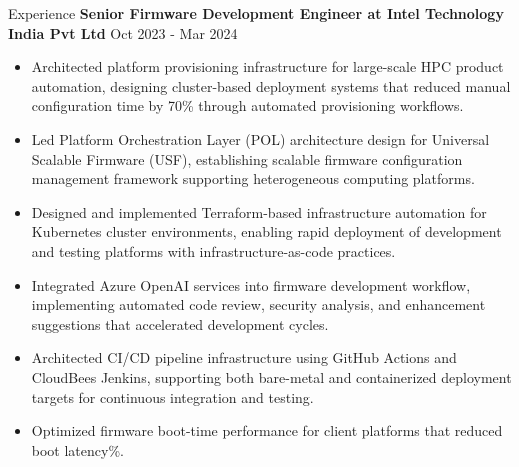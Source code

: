\documentclass{resume} %
\begin{document}
\begin{rSection}{Experience}
{\textbf{Senior Firmware Development Engineer at Intel Technology India Pvt Ltd}}  \hfill {Oct 2023 - Mar 2024}
\begin{itemize}
    \item Architected platform provisioning infrastructure for large-scale HPC product automation, designing cluster-based deployment systems that reduced manual configuration time by 70\% through automated provisioning workflows.
    \item Led Platform Orchestration Layer (POL) architecture design for Universal Scalable Firmware (USF), establishing scalable firmware configuration management framework supporting heterogeneous computing platforms.
    \item Designed and implemented Terraform-based infrastructure automation for Kubernetes cluster environments, enabling rapid deployment of development and testing platforms with infrastructure-as-code practices.
    \item Integrated Azure OpenAI services into firmware development workflow, implementing automated code review, security analysis, and enhancement suggestions that accelerated development cycles.
    \item Architected CI/CD pipeline infrastructure using GitHub Actions and CloudBees Jenkins, supporting both bare-metal and containerized deployment targets for continuous integration and testing.
    \item Optimized firmware boot-time performance for client platforms that reduced boot latency\%.
\end{itemize}
 

\end{rSection}
\end{document}
